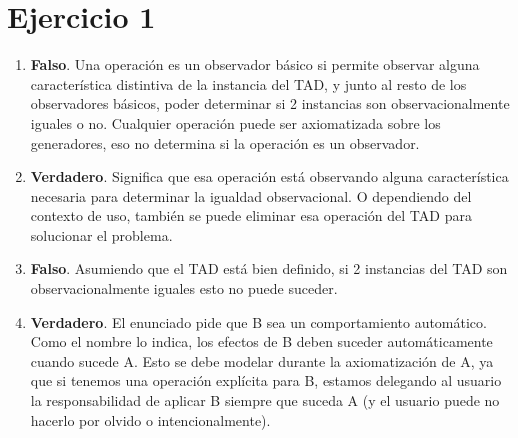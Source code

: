 \section*{Ejercicio 1}

\begin{enumerate}
    \item \textbf{Falso}. Una operación es un observador básico si permite observar alguna característica distintiva de la instancia del TAD, y junto al resto de los observadores básicos, poder determinar si 2 instancias son observacionalmente iguales o no. Cualquier operación puede ser axiomatizada sobre los generadores, eso no determina si la operación es un observador.
    \item \textbf{Verdadero}. Significa que esa operación está observando alguna característica necesaria para determinar la igualdad observacional. O dependiendo del contexto de uso, también se puede eliminar esa operación del TAD para solucionar el problema.
    \item \textbf{Falso}. Asumiendo que el TAD está bien definido, si 2 instancias del TAD son observacionalmente iguales esto no puede suceder.
    \item \textbf{Verdadero}. El enunciado pide que B sea un comportamiento automático. Como el nombre lo indica, los efectos de B deben suceder automáticamente cuando sucede A. Esto se debe modelar durante la axiomatización de A, ya que si tenemos una operación explícita para B, estamos delegando al usuario la responsabilidad de aplicar B siempre que suceda A (y el usuario puede no hacerlo por olvido o intencionalmente).
\end{enumerate}
